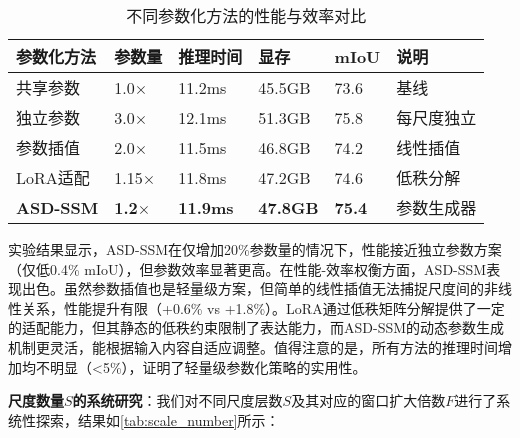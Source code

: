\documentclass[preprint,12pt]{elsarticle}
\begin{document}
\begin{table}[htbp!]
	\centering
	\caption{不同参数化方法的性能与效率对比}
	\label{tab:parameterization_comparison}
	\begin{tabular}{@{}llllll@{}}
		\toprule
		参数化方法 & 参数量 & 推理时间 & 显存 & mIoU & 说明 \\ 
		\midrule
		共享参数 & 1.0$\times$ & 11.2ms & 45.5GB & 73.6 & 基线 \\
		\midrule
		独立参数 & 3.0$\times$ & 12.1ms & 51.3GB & 75.8 & 每尺度独立 \\
		参数插值 & 2.0$\times$ & 11.5ms & 46.8GB & 74.2 & 线性插值 \\
		LoRA适配 & 1.15$\times$ & 11.8ms & 47.2GB & 74.6 & 低秩分解 \\
		\textbf{ASD-SSM} & \textbf{1.2$\times$} & \textbf{11.9ms} & \textbf{47.8GB} & \textbf{75.4} & 参数生成器 \\
		\bottomrule
	\end{tabular}
\end{table}

实验结果显示，ASD-SSM在仅增加20\%参数量的情况下，性能接近独立参数方案（仅低0.4\% mIoU），但参数效率显著更高。在性能-效率权衡方面，ASD-SSM表现出色。虽然参数插值也是轻量级方案，但简单的线性插值无法捕捉尺度间的非线性关系，性能提升有限（+0.6\% vs +1.8\%）。LoRA通过低秩矩阵分解提供了一定的适配能力，但其静态的低秩约束限制了表达能力，而ASD-SSM的动态参数生成机制更灵活，能根据输入内容自适应调整。值得注意的是，所有方法的推理时间增加均不明显（<5\%），证明了轻量级参数化策略的实用性。

\textbf{尺度数量$S$的系统研究}：我们对不同尺度层数$S$及其对应的窗口扩大倍数$F$进行了系统性探索，结果如\cref{tab:scale_number}所示：
\end{document}

